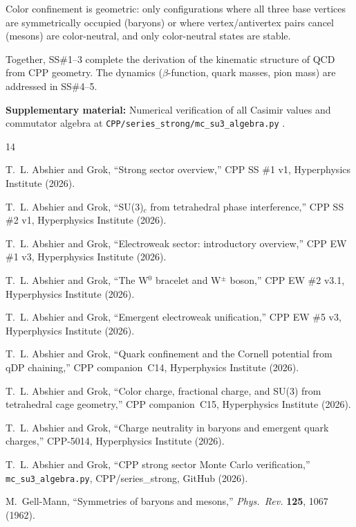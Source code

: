 \documentclass[11pt,a4paper]{article}
\begin{document}
Color confinement is geometric: only configurations where all
three base vertices are symmetrically occupied (baryons) or where
vertex/antivertex pairs cancel (mesons) are color-neutral, and
only color-neutral states are stable.

Together, SS\#1--3 complete the derivation of the kinematic
structure of QCD from CPP geometry.  The dynamics
($\beta$-function, quark masses, pion mass) are addressed in
SS\#4--5.

\noindent\textbf{Supplementary material:} Numerical verification
of all Casimir values and commutator algebra at
\texttt{CPP/series\_strong/mc\_su3\_algebra.py}
\citep{cpp_ss_mc}.


\begin{thebibliography}{14}

T.~L. Abshier and Grok,
``Strong sector overview,''
CPP SS \#1 v1, Hyperphysics Institute (2026).

T.~L. Abshier and Grok,
``SU(3)$_c$ from tetrahedral phase interference,''
CPP SS \#2 v1, Hyperphysics Institute (2026).

T.~L. Abshier and Grok,
``Electroweak sector: introductory overview,''
CPP EW \#1 v3, Hyperphysics Institute (2026).

T.~L. Abshier and Grok,
``The W$^0$ bracelet and W$^\pm$ boson,''
CPP EW \#2 v3.1, Hyperphysics Institute (2026).

T.~L. Abshier and Grok,
``Emergent electroweak unification,''
CPP EW \#5 v3, Hyperphysics Institute (2026).

T.~L. Abshier and Grok,
``Quark confinement and the Cornell potential from qDP chaining,''
CPP companion~C14, Hyperphysics Institute (2026).

T.~L. Abshier and Grok,
``Color charge, fractional charge, and SU(3) from tetrahedral cage geometry,''
CPP companion~C15, Hyperphysics Institute (2026).

T.~L. Abshier and Grok,
``Charge neutrality in baryons and emergent quark charges,''
CPP-5014, Hyperphysics Institute (2026).

T.~L. Abshier and Grok,
``CPP strong sector Monte Carlo verification,''
\texttt{mc\_su3\_algebra.py},
CPP/series\_strong, GitHub (2026).

M.~Gell-Mann,
``Symmetries of baryons and mesons,''
\textit{Phys.\ Rev.} \textbf{125}, 1067 (1962).


\end{thebibliography}
\end{document}
